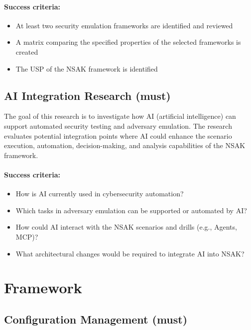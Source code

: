 \paragraph{Success criteria:}

\begin{itemize}
	\item At least two security emulation frameworks are identified and reviewed
	\item A matrix comparing the specified properties of the selected frameworks is created
	\item The USP of the \gls{NSAK} framework is identified
\end{itemize}

\subsection{\gls{AI} Integration Research (must)}\label{subsec:ai-integration-research}

The goal of this research is to investigate how \gls{AI} (artificial intelligence) can support automated security testing and adversary emulation.
The research evaluates potential integration points where \gls{AI} could enhance the scenario execution, automation, decision-making, and analysis capabilities of the \gls{NSAK} framework.

\paragraph{Success criteria:}

\begin{itemize}
	\item How is \gls{AI} currently used in cybersecurity automation?
	\item Which tasks in adversary emulation can be supported or automated by \gls{AI}?
	\item How could \gls{AI} interact with the \gls{NSAK} scenarios and drills (e.g., Agents, \gls{MCP})?
	\item What architectural changes would be required to integrate \gls{AI} into \gls{NSAK}?
\end{itemize}

\section{Framework}\label{sec:framework}

\subsection{Configuration Management (must)}\label{subsec:configuration-management}

